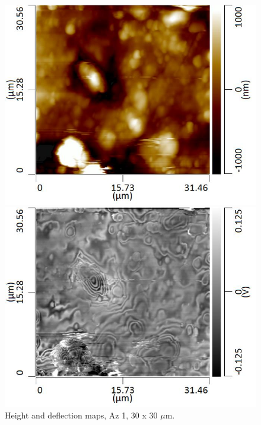 \begin{figure}[H]
\centering
\begin{minipage}{.45\textwidth}
  \centering
  \includegraphics[width=\linewidth]{Az1_tapping_mode_240521_height_2}
\end{minipage}
\begin{minipage}{.45\textwidth}
  \centering
  \includegraphics[width=\linewidth]{Az1_tapping_mode_240521_def_2}
\end{minipage}
\caption[Height and deflection maps, Az 1]{Height and deflection maps, Az 1, 30 x 30 $\mu$m.}
\label{fig:afm_az1_height_def_5}
\end{figure}

